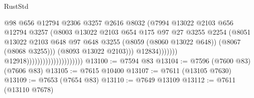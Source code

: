 \begin{lexlean}{RustStd}
\begin{coremodule}
{\begin{coremodule}
{{{{{{{{{{{{{{{{{{{{{{{{{{{{{{{{{{                                                            @98
                                                            @656
                                                            @12794
                                                            @2306
                                                            @3257
                                                            @2616
                                                            @8032
                                                            (@7994
                                                              @13022
                                                              @2103
                                                              @656
                                                              @12794
                                                              @3257
                                                              (@8003
                                                                @13022
                                                                @2103
                                                                @654
                                                                @175
                                                                @97
                                                                @27
                                                                @3255
                                                                @2254
                                                                (@8051
                                                                  @13022
                                                                  @2103
                                                                  @648
                                                                  @97
                                                                  @648
                                                                  @3255
                                                                  (@8059 (@8060 @13022 @648))
                                                                  (@8067 (@8068 @3255)))
                                                                (@8093 @13022 @2103)))
                                                            @12834)))))))
                                              @12918)))))))))))))))))))))
@13100 := @7594 @83
@13104 := @7596 (@7600 @83) (@7606 @83)
@13105 := @7615 @10400
@13107 := @7611 (@13105 @7630)
@13109 := @7653 (@7654 @83)
@13110 := @7649 @13109
@13112 := @7611 (@13110 @7678)
}}}}}}}}}}}}}}}}}}}}}}}}}}}}}}}}}}
\end{coremodule}}
\end{coremodule}
\end{lexlean}
